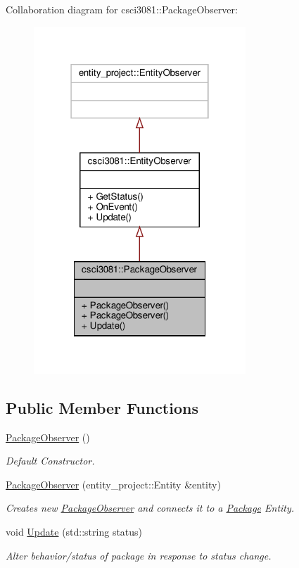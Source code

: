 Collaboration diagram for csci3081\+:\+:Package\+Observer\+:\nopagebreak
\begin{figure}[H]
\begin{center}
\leavevmode
\includegraphics[width=226pt]{classcsci3081_1_1PackageObserver__coll__graph}
\end{center}
\end{figure}
\subsection*{Public Member Functions}
\begin{DoxyCompactItemize}
\item 
\mbox{\label{classcsci3081_1_1PackageObserver_af2b41fe1a6a326362f93a12bb798d0d5}} 
\hyperlink{classcsci3081_1_1PackageObserver_af2b41fe1a6a326362f93a12bb798d0d5}{Package\+Observer} ()
\begin{DoxyCompactList}\small\item\em Default Constructor. \end{DoxyCompactList}\item 
\hyperlink{classcsci3081_1_1PackageObserver_a053e974efd7433e5b92012e68b1aee42}{Package\+Observer} (entity\+\_\+project\+::\+Entity \&entity)
\begin{DoxyCompactList}\small\item\em Creates new \hyperlink{classcsci3081_1_1PackageObserver}{Package\+Observer} and connects it to a \hyperlink{classcsci3081_1_1Package}{Package} Entity. \end{DoxyCompactList}\item 
void \hyperlink{classcsci3081_1_1PackageObserver_a8ebc5b23b82ee2a2d0ec13872f24fb6c}{Update} (std\+::string status)
\begin{DoxyCompactList}\small\item\em Alter behavior/status of package in response to status change. \end{DoxyCompactList}\end{DoxyCompactItemize}


